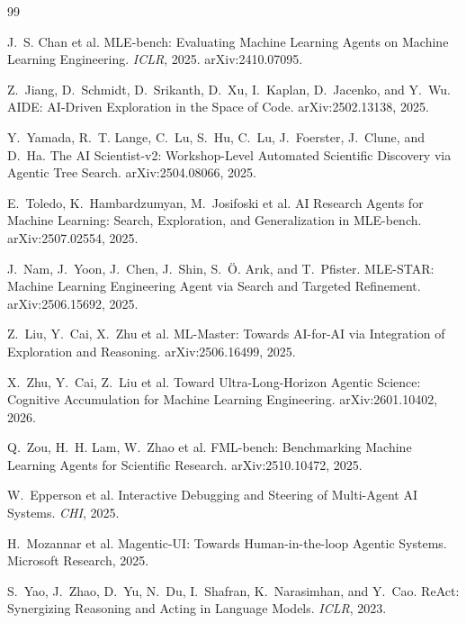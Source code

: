 \documentclass[11pt]{article}
\begin{document}
\begin{thebibliography}{99}

J.~S. Chan et al.
\newblock MLE-bench: Evaluating Machine Learning Agents on Machine Learning
  Engineering.
\newblock \emph{ICLR}, 2025. arXiv:2410.07095.

Z.~Jiang, D.~Schmidt, D.~Srikanth, D.~Xu, I.~Kaplan, D.~Jacenko, and Y.~Wu.
\newblock AIDE: AI-Driven Exploration in the Space of Code.
\newblock arXiv:2502.13138, 2025.

Y.~Yamada, R.~T. Lange, C.~Lu, S.~Hu, C.~Lu, J.~Foerster, J.~Clune, and D.~Ha.
\newblock The AI Scientist-v2: Workshop-Level Automated Scientific Discovery via
  Agentic Tree Search.
\newblock arXiv:2504.08066, 2025.

E.~Toledo, K.~Hambardzumyan, M.~Josifoski et al.
\newblock AI Research Agents for Machine Learning: Search, Exploration, and
  Generalization in MLE-bench.
\newblock arXiv:2507.02554, 2025.

J.~Nam, J.~Yoon, J.~Chen, J.~Shin, S.~\"O. Ar{\i}k, and T.~Pfister.
\newblock MLE-STAR: Machine Learning Engineering Agent via Search and Targeted
  Refinement.
\newblock arXiv:2506.15692, 2025.

Z.~Liu, Y.~Cai, X.~Zhu et al.
\newblock ML-Master: Towards AI-for-AI via Integration of Exploration and Reasoning.
\newblock arXiv:2506.16499, 2025.

X.~Zhu, Y.~Cai, Z.~Liu et al.
\newblock Toward Ultra-Long-Horizon Agentic Science: Cognitive Accumulation for
  Machine Learning Engineering.
\newblock arXiv:2601.10402, 2026.

Q.~Zou, H.~H. Lam, W.~Zhao et al.
\newblock FML-bench: Benchmarking Machine Learning Agents for Scientific Research.
\newblock arXiv:2510.10472, 2025.

W.~Epperson et al.
\newblock Interactive Debugging and Steering of Multi-Agent AI Systems.
\newblock \emph{CHI}, 2025.

H.~Mozannar et al.
\newblock Magentic-UI: Towards Human-in-the-loop Agentic Systems.
\newblock Microsoft Research, 2025.

S.~Yao, J.~Zhao, D.~Yu, N.~Du, I.~Shafran, K.~Narasimhan, and Y.~Cao.
\newblock ReAct: Synergizing Reasoning and Acting in Language Models.
\newblock \emph{ICLR}, 2023.


\end{thebibliography}
\end{document}
